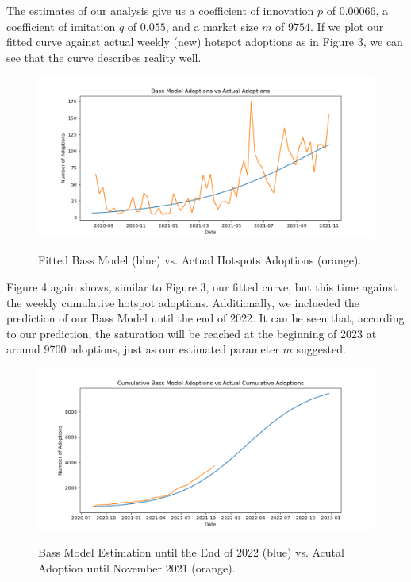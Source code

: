 \documentclass{article}
\begin{document}
\noindent The estimates of our analysis give us a coefficient of innovation $p$ of $0.00066$, a coefficient of imitation $q$ of $0.055$, and a market size $m$ of $9754$. If we
plot our fitted curve against actual weekly (new) hotspot adoptions as in Figure 3, we can see that the curve describes reality well.

\begin{figure}[!hptb]
    \centering{}\includegraphics[scale=0.6]{plots/bass_model_adoptions_vs_actual_adoptions.png}\\
    \caption{Fitted Bass Model (blue) vs. Actual Hotspots Adoptions (orange).}
\end{figure}

\noindent Figure 4 again shows, similar to Figure 3, our fitted curve, but this time against the weekly cumulative hotspot adoptions. Additionally, we inclueded the prediction
of our Bass Model until the end of 2022. It can be seen that, according to our prediction, the saturation will be reached at the beginning of 2023 at around $9700$ adoptions,
just as our estimated parameter $m$ suggested.

\bigskip
\bigskip
\bigskip
\bigskip

\begin{figure}[!hptb]
    \centering{}\includegraphics[scale=0.6]{plots/cumulative_bass_model_adoptions_vs_actual_cumulative_adoptions.png}\\
    \caption{Bass Model Estimation until the End of 2022 (blue) vs. Acutal Adoption until November 2021 (orange).}
\end{figure}
\end{document}

